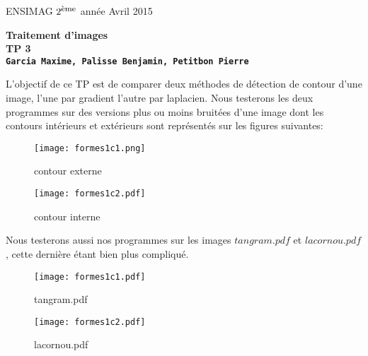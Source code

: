 \documentclass[12pt]{article}
\newcommand{\noi}{\noindent}
\numberwithin{equation}{section}
\begin{document}
\baselineskip7mm

\noi ENSIMAG $2^{\footnotesize \mbox{ème}}$ année   \hfill Avril 2015


\vspace{1cm}


\begin{center}
{\Large \bf Traitement d'images\\ TP 3 \\ \texttt{Garcia Maxime, Palisse Benjamin, Petitbon Pierre}}
\end{center}

\vspace{5mm}

L'objectif de ce TP est de comparer deux méthodes de détection de contour d'une image, l'une par gradient l'autre par laplacien. Nous testerons les deux programmes sur des versions plus ou moins bruitées d'une image dont les contours intérieurs et extérieurs sont représentés sur les figures suivantes:


	\begin{figure}[!ht]
        \begin{center}
           \texttt{[image: formes1c1.png]} 
           \caption{contour externe}
        \end{center}
    \end{figure}

	\begin{figure}[!ht]
        \begin{center}
           \texttt{[image: formes1c2.pdf]} 
           \caption{contour interne}
        \end{center}
    \end{figure}

Nous testerons aussi nos programmes sur les images $tangram.pdf$ et $lacornou.pdf$, cette dernière étant bien plus compliqué.

 	\begin{figure}[!ht]
        \begin{center}
           \texttt{[image: formes1c1.pdf]} 
           \caption{tangram.pdf}
        \end{center}
    \end{figure}

	\begin{figure}[!ht]
        \begin{center}
           \texttt{[image: formes1c2.pdf]} 
           \caption{lacornou.pdf}
        \end{center}
    \end{figure}
\end{document}
